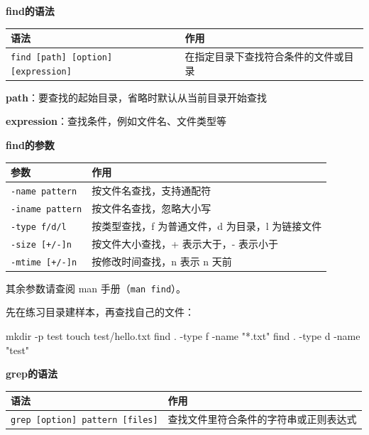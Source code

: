 \begin{table}[H]\centering
\textbf{find\enspace 的语法}

	\begin{tabular}{p{}p{}}
		\toprule[1.5pt]
		语法 & 作用\\
		\midrule[1pt]
		\texttt{find  [path]  [option]  [expression]}		&在指定目录下查找符合条件的文件或目录\\
		\bottomrule[1.5pt]
	\end{tabular}
\end{table}


\textbf{path}：要查找的起始目录，省略时默认从当前目录开始查找

\textbf{expression}：查找条件，例如文件名、文件类型等\\


\begin{table}[H]\centering
\textbf{find\enspace 的参数}

	\begin{tabular}{p{}p{}}
		\toprule[1.5pt]
		参数 & 作用\\
		\midrule[1pt]
		\texttt{-name  pattern}		&按文件名查找，支持通配符\\
		\texttt{-iname  pattern}		&按文件名查找，忽略大小写\\
		\texttt{-type  f/d/l}		&按类型查找，f 为普通文件，d 为目录，l 为链接文件\\
		\texttt{-size  [+/-]n}		&按文件大小查找，+ 表示大于，- 表示小于\\
		\texttt{-mtime  [+/-]n}		&按修改时间查找，n 表示 n 天前\\
		\bottomrule[1.5pt]
	\end{tabular}
\end{table}


其余参数请查阅 man 手册（\texttt{man find}）。

\begin{example}
先在练习目录建样本，再查找自己的文件：


\begin{tbash}
mkdir -p test
touch test/hello.txt
find . -type f -name "*.txt"
find . -type d -name "test"
\end{tbash}


\end{example}


\begin{table}[H]\centering
\textbf{grep\enspace 的语法}

	\begin{tabular}{p{}p{}}
		\toprule[1.5pt]
		语法 & 作用\\
		\midrule[1pt]
		\texttt{grep  [option]  pattern  [files]}		&查找文件里符合条件的字符串或正则表达式\\
		\bottomrule[1.5pt]
	\end{tabular}
\end{table}


